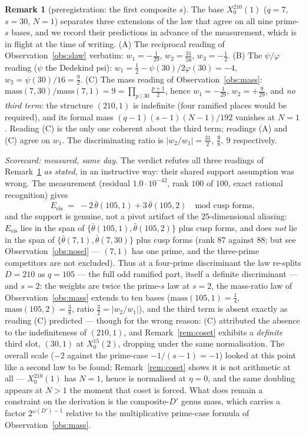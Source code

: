 \documentclass[11pt,reqno]{amsart}
\theoremstyle{plain}
\theoremstyle{definition}
\newtheorem{remark}[theorem]{Remark}
\begin{document}
\begin{remark}[preregistration: the first composite $s$]\label{rem:210}
The base $X_0^{210}(1)$ ($q=7$, $s=30$, $N=1$) separates three extensions of the law
that agree on all nine prime-$s$ bases, and we record their predictions in advance of the
measurement, which is in flight at the time of writing. (A) The reciprocal reading of
Observation~\ref{obs:slaw} verbatim: $w_1=-\tfrac1{29}$, $w_2=\tfrac{31}{58}$,
$w_3=-\tfrac12$. (B) The $\psi/\varphi$ reading ($\psi$ the Dedekind psi):
$w_1=\tfrac12-\psi(30)/2\varphi(30)=-4$, $w_2=\psi(30)/16=\tfrac92$. (C) The mass reading of Observation~\ref{obs:mass}:
$\mathrm{mass}(7,30)/\mathrm{mass}(7,1)=9=\prod_{p\mid30}\tfrac{p+1}2$, hence
$w_1=-\tfrac1{29}$, $w_2=+\tfrac9{29}$, and \emph{no third term}: the structure
$(210,1)$ is indefinite (four ramified places would be required), and its formal mass
$(q-1)(s-1)(N-1)/192$ vanishes at $N=1$. Reading (C) is the only one coherent about the
third term; readings (A) and (C) agree on $w_1$. The discriminating ratio is
$\lvert w_2/w_1\rvert=\tfrac{31}2,\ \tfrac98,\ 9$ respectively.
\end{remark}

\emph{Scorecard: measured, same day.} The verdict refutes all three readings of
Remark~\ref{rem:210} \emph{as
stated}, in an instructive way: their shared support assumption was wrong. The measurement
(residual $1.0\cdot10^{-42}$, rank $100$ of $100$, exact rational recognition) gives
\[
  E_{\mathrm{eis}}\;=\;-2\,\bar\theta(105,1)+3\,\bar\theta(105,2)\quad\text{mod cusp forms},
\]
and the support is genuine, not a pivot artifact of the $25$-dimensional aliasing:
$E_{\mathrm{eis}}$ lies in the span of $\{\bar\theta(105,1),\bar\theta(105,2)\}$ plus cusp
forms, and does \emph{not} lie in the span of $\{\bar\theta(7,1),\bar\theta(7,30)\}$ plus cusp
forms (rank $87$ against $88$; but see Observation~\ref{obs:nosel} --- $(7,1)$ has one prime,
and the three-prime competitors are not excluded). Thus at a four-prime discriminant the law re-splits
$D=210$ as $q=105$ --- the full odd ramified part, itself a definite discriminant --- and
$s=2$: the weights are twice the prime-$s$ law at $s=2$, the mass-ratio law of
Observation~\ref{obs:mass} extends to ten bases
($\mathrm{mass}(105,1)=\tfrac14$, $\mathrm{mass}(105,2)=\tfrac38$, ratio
$\tfrac32=\lvert w_2/w_1\rvert$), and the third term is absent exactly as reading (C)
predicted --- though for the wrong reason: (C) attributed the absence to the indefiniteness
of $(210,1)$, and Remark~\ref{rem:coset} exhibits a \emph{definite} third slot,
$(30,1)$ at $X_0^{15}(2)$, dropping under the same normalisation. The overall scale ($-2$ against the prime-case $-1/(s-1)=-1$) looked at this
point like a second law to be found; Remark~\ref{rem:coset} shows it is not arithmetic at
all --- $X_0^{210}(1)$ has $N=1$, hence is normalised at $\eta=0$, and the same doubling
appears at $N>1$ the moment that coset is forced. What does remain a constraint on the
derivation is the composite-$D'$ genus mass, which carries a factor $2^{\omega(D')-1}$
relative to the multiplicative prime-case formula of Observation~\ref{obs:mass}.
\end{document}

